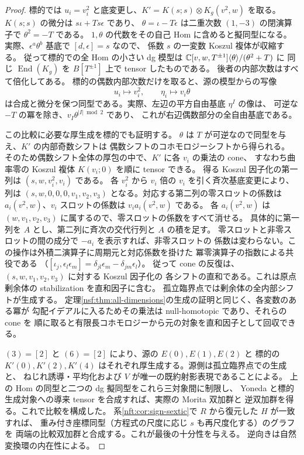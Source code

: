 \begin{proof}
標的では $u_i=v_i^2$ と底変更し、$K'=K(s;s)\otimes K_g(v^2,w)$ を取る。
$K(s;s)$ の微分は $s\iota+Ts\epsilon$ であり、
$\theta=\iota-T\epsilon$ は二重次数 $(1,-3)$ の閉演算子で $\theta^2=-T$ である。
$1,\theta$ の代数をその自己 Hom に含めると擬同型になる。
実際、$\epsilon^a\theta^b$ 基底で $[d,\epsilon]=s$ なので、
係数 $s$ の一変数 Koszul 複体が収縮する。
従って標的での全 Hom の小さい dg 模型は
$\mathbb C[v,w,T^{\pm1}]\langle\theta\rangle/(\theta^2+T)$ に
同じ $\operatorname{End}(K_g)$ を $B[T^{\pm1}]$ 上で tensor したものである。
後者の内部次数はすべて倍化してある。
標的の偶数内部次数だけを取ると、源の模型からの写像
\[
              u_i\longmapsto v_i^2,\qquad \eta_i\longmapsto v_i\theta
\]
は合成と微分を保つ同型である。実際、左辺の平方自由基底 $\eta^I$ の像は、
可逆な $-T$ の冪を除き、$v_I\theta^{|I|\bmod2}$ であり、
これが右辺偶数部分の全自由基底である。

この比較に必要な厚生成を標的でも証明する。
$\theta$ は $T$ が可逆なので同型を与え、$K'$ の内部奇数シフトは
偶数シフトのコホモロジーシフトから得られる。
そのため偶数シフト全体の厚包の中で、$K'$ に各 $v_i$ の乗法の cone、
すなわち曲率零の Koszul 複体 $K(v_i;0)$ を順に tensor できる。
得る Koszul 因子化の第一列は $(s,w,v_i^2,v_i)$ である。
各 $v_i^2$ から $v_i$ 倍の $v_i$ を引く斉次基底変更により、列は
$(s,w,0,0,0,v_1,v_2,v_3)$ となる。対応する第二列の零スロットの係数は
$a_i(v^2,w)$、$v_i$ スロットの係数は $v_i a_i(v^2,w)$ である。
各 $a_i(v^2,w)$ は $(w,v_1,v_2,v_3)$ に属するので、零スロットの係数をすべて消せる。
具体的に第一列を $A$ とし、第二列に斉次の交代行列と $A$ の積を足す。
零スロットと非零スロットの間の成分で $-a_i$ を表示すれば、非零スロットの
係数は変わらない。この操作は外積二演算子に周期元と対応係数を掛けた
冪零演算子の指数による共役である
（$[\iota_j,\epsilon_l\epsilon_m]=\delta_{jl}\epsilon_m-\delta_{jm}\epsilon_l$）。
従って cone の反復は、$(s,w,v_1,v_2,v_3)$ に対する Koszul 因子化の
各シフトの直和である。これは原点剰余体の stabilization を直和因子に含む。
孤立臨界点では剰余体の全内部シフトが生成する。
定理\ref{nsf:thm:all-dimensions}の生成の証明と同じく、各変数のある冪が
勾配イデアルに入るためその乗法は null-homotopic であり、それらの cone を
順に取ると有限長コホモロジーから元の対象を直和因子として回収できる。

$(3)=[2]$ と $(6)=[2]$ により、源の $E(0),E(1),E(2)$ と
標的の $K'(0),K'(2),K'(4)$ はそれぞれ厚生成する。源側は孤立臨界点での生成と、
ねじれ誘導・平均化および $V$ が唯一の既約射影表現であることによる。
上の Hom の同型と二つの dg 擬同型をこれら三対象間に制限し、
Yoneda と標的生成対象への導来 tensor を合成すれば、実際の Morita 双加群と
逆双加群を得る。これで比較を構成した。
系\ref{nft:cor:sign-sextic}で $R$ から復元した $H$ が一致すれば、
重み付き座標同型（方程式の尺度に応じ $s$ も再尺度化する）のグラフを
両端の比較双加群と合成する。これが最後の十分性を与える。
逆向きは自然変換環の内在性による。
\end{proof}

